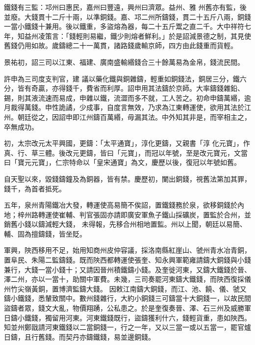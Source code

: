 \begin{pinyinscope}
 鐵錢有三監：邛州曰惠民，嘉州曰豐遠，興州曰濟眾。益州、雅
 州舊亦有監，後並廢。大錢貫十二斤十兩，以準銅錢。嘉、邛二州所鑄錢，貫二十五斤八兩，銅錢一當小鐵錢十兼用。後以鐵重，多盜熔為器，每二十五斤鬻之直二千。大中祥符七年，知益州凌策言：「錢輕則易繼，鐵少則熔者鮮利。」於是詔減景德之制，其見使舊錢仍用如故。歲鑄總二十一萬貫，諸路錢歲輸京師，四方由此錢重而貨輕。



 景祐初，詔三司以江東、福建、廣南盛輸緡錢合三十餘萬易為金帛，錢流民間。



 許申為三司度支判官，建
 議以藥化鐵與銅雜鑄，輕重如銅錢法，銅居三分，鐵六分，皆有奇贏，亦得錢千，費省而利厚。詔申用其法鑄於京師。大率鑄錢雜鉛、錫，則其液流速而易成，申雜以鐵，流澀而多不就，工人苦之。初命申鑄萬緡，逾月裁得萬錢。申性詭譎，少成事，自度言無效，乃求為江東轉運使，欲用其法於江州。朝廷從之，因詔申即江州鑄百萬緡，毋漏其法。中外知其非是，而宰相主之，卒無成功。



 初，太宗改元太平興國，更鑄：「太平通寶」，淳化更鑄，又親書「淳
 化元寶」，作真、行、草三體。後改元更鑄，皆曰「元寶」，而冠以年號，至是改元寶元，文當曰「寶元元寶」，仁宗特命以「皇宋通寶」為文，慶歷以後，復冠以年號如舊。



 自天聖以來，毀錢鑄鐘及為銅器，皆有禁。慶歷初，闌出銅錢，視舊法第加其罪，錢千，為首者抵死。



 五年，泉州青陽鐵冶大發，轉運使高易簡不俟詔，置鐵錢務於泉，欲移銅錢於內地；梓州路轉運使崔輔、判官張固亦請即廣安軍魚子鐵山採礦炭，置監於合州，並銷舊小錢以鑄減輕大錢，
 未得報，先移合州相地置監。州以上聞，朝廷以易簡、輔、固為擅鑄錢，皆坐貶。



 軍興，陜西移用不足，始用知商州皮仲容議，採洛南縣紅崖山、虢州青水冶青銅，置阜民、朱陽二監鑄錢。既而陜西都轉運使張奎、知永興軍範雍請鑄大銅錢與小錢兼行，大錢一當小錢十；又請因晉州積鐵鑄小錢。及奎徙河東，又鑄大鐵錢於晉、澤二州，亦以一當十，助關中軍費。未幾，三司奏罷河東鑄大鐵錢，而陜西復採儀州竹尖嶺黃銅，置博濟監鑄大錢。
 因敕江南鑄大銅錢，而江、池、饒、儀、虢又鑄小鐵錢，悉輦致關中。數州錢雜行，大約小銅錢三可鑄當十大銅錢一，以故民間盜鑄者眾，錢文大亂，物價翔踴，公私患之。於是奎復奏晉、澤、石三州及威勝軍日鑄小鐵錢，獨留用河東。河東鐵錢既行，盜鑄獲利什六，錢輕貨重，患如陜西。知並州鄭戩請河東鐵錢以二當銅錢一，行之一年，又以三當一或以五當一，罷官爐日鑄，且行舊錢。而契丹亦鑄鐵錢，易並邊銅錢。




\end{pinyinscope}
